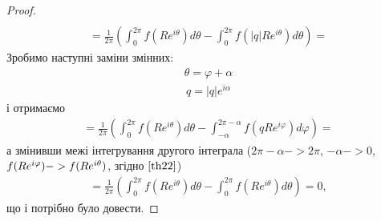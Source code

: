 \documentclass[12pt,a4paper]{article}
\begin{document}
\begin{proof}
\[\begin{array}{l}
\end{array} \] 
\[\begin{array}{l}
= \frac{1}{2\pi}(\int_{0}^{2\pi} f(Re^{i\theta})d\theta  - \int_{0}^{2\pi}f(\left |q \right |Re^{i\theta })d\theta) = 
\end{array} \]
Зробимо наступні заміни змінних:
\begin{equation}\label{th22}
\begin{array}{l}
\theta =\varphi +\alpha 
\end{array} 
\end{equation}
\begin{equation}\label{th23}
\begin{array}{l}
q=\left |q  \right |e^{i\alpha }
\end{array} 
\end{equation}
і отримаємо
\[\begin{array}{l}
= \frac{1}{2\pi}(\int_{0}^{2\pi} f(Re^{i\theta})d\theta  - \int_{-\alpha}^{2\pi-\alpha}f(qRe^{i\varphi })d\varphi)=
\end{array} \]
а змінивши межі інтегрування другого інтеграла ($2\pi-\alpha->2\pi$, $ -\alpha->0$, $ \\
f(Re^{i\varphi})->f(Re^{i\theta})$, згідно $\eqref {th22} $)
\[\begin{array}{l}
=\frac{1}{2\pi}(\int_{0}^{2\pi} f(Re^{i\theta})d\theta - \int_{0}^{2\pi}f(Re^{i\theta })d\theta)=0,
\end{array}\]
що і потрібно було довести.
\end{proof}
\[\begin{array}{l}
\end{array} \]
\end{document}
